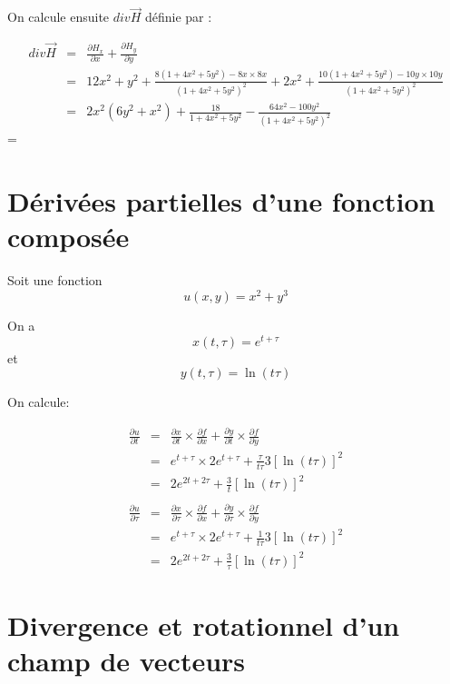 \documentclass[a4paper, 11pt]{report} %
\newcommand{\vect}{\overrightarrow}
\begin{document}
On calcule ensuite $div\vect{H}$ définie par :

\begin{eqnarray*}
    div\vect{H} & = & \frac{\partial H_x}{\partial x} + \frac{\partial H_y}{\partial y}\\
                & = & 12x^2+y^2 + \frac{8(1+4x^2+5y^2) - 8x\times8x}{\left(1+4x^2+5y^2\right)^2} + 2x^2 + \frac{10(1+4x^2+5y^2) - 10y\times10y}{\left(1+4x^2+5y^2\right)^2}\\
                & = & 2x^2(6y^2+x^2) + \frac{18}{1+4x^2+5y^2} - \frac{64x^2-100y^2}{\left(1+4x^2+5y^2\right)^2}
\end{eqnarray*}
=\section{Dérivées partielles d'une fonction composée} %

Soit une fonction $$u(x, y) = x^2 + y^3$$

On a $$x(t, \tau) = e^{t+\tau}$$ et $$y(t, \tau) = \ln(t\tau)$$

On calcule: 

\begin{eqnarray*}
    \frac{\partial u}{\partial t}   & = & \frac{\partial x}{\partial t}\times\frac{\partial f}{\partial x} +
                                                \frac{\partial y}{\partial t}\times\frac{\partial f}{\partial y}\\
                                            & = & e^{t+\tau}\times2e^{t+\tau}+\frac{\tau}{t\tau}3\left[\ln(t\tau)\right]^2\\
                                    & = & 2e^{2t+2\tau} + \frac{3}{t}\left[\ln(t\tau)\right]^2\\
                                    &   &\\
    \frac{\partial u}{\partial\tau}   & = & \frac{\partial x}{\partial\tau}\times\frac{\partial f}{\partial x} +
                                                \frac{\partial y}{\partial\tau}\times\frac{\partial f}{\partial y}\\
                                            & = & e^{t+\tau}\times2e^{t+\tau}+\frac{1}{t\tau}3\left[\ln(t\tau)\right]^2\\
                                    & = & 2e^{2t+2\tau} + \frac{3}{\tau}\left[\ln(t\tau)\right]^2
\end{eqnarray*}

\section{Divergence et rotationnel d'un champ de vecteurs} %
\end{document}
